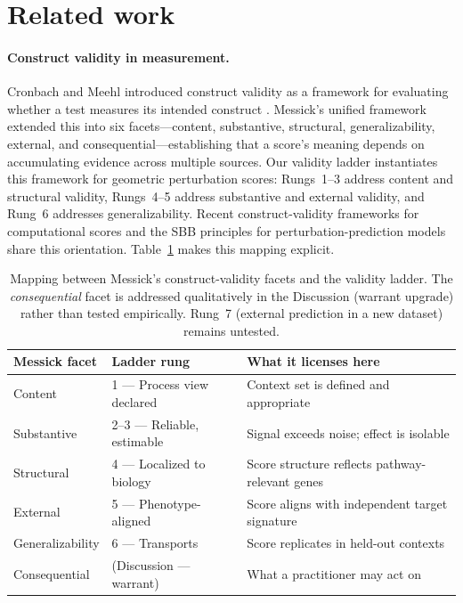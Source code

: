 \documentclass[11pt]{article}
\begin{document}
\section{Related work}

\paragraph{Construct validity in measurement.}
Cronbach and Meehl introduced construct validity as a framework for
evaluating whether a test measures its intended construct
\citep{cronbach1955construct}. Messick's unified framework
\citep{messick1995validity} extended this into six facets---content,
substantive, structural, generalizability, external, and
consequential---establishing that a score's meaning depends on
accumulating evidence across multiple sources. Our validity ladder instantiates this framework for
geometric perturbation scores: Rungs~1--3 address content and structural
validity, Rungs~4--5 address substantive and external validity, and
Rung~6 addresses generalizability. Recent construct-validity
frameworks for computational scores \citep{freiesleben2025benchmarking,
watson2025measuring} and the SBB principles for perturbation-prediction
models \citep{sbb2026principles} share this orientation.
Table~\ref{tab:messick} makes this mapping explicit.

\begin{table}[t]
\centering
\caption{Mapping between Messick's construct-validity facets and
the validity ladder.
The \emph{consequential} facet is addressed qualitatively in the
Discussion (warrant upgrade) rather than tested empirically.
Rung~7 (external prediction in a new dataset) remains untested.}
\label{tab:messick}
\small
\begin{tabular}{lll}
\toprule
Messick facet & Ladder rung & What it licenses here \\
\midrule
Content & 1 --- Process view declared & Context set is defined and appropriate \\
Substantive & 2--3 --- Reliable, estimable & Signal exceeds noise; effect is isolable \\
Structural & 4 --- Localized to biology & Score structure reflects pathway-relevant genes \\
External & 5 --- Phenotype-aligned & Score aligns with independent target signature \\
Generalizability & 6 --- Transports & Score replicates in held-out contexts \\
Consequential & (Discussion --- warrant) & What a practitioner may act on \\
\bottomrule
\end{tabular}
\end{table}
\end{document}
